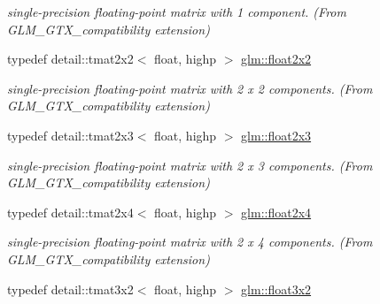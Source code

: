 \begin{DoxyCompactItemize}
\begin{DoxyCompactList}\small\item\em single-\/precision floating-\/point matrix with 1 component. (From G\+L\+M\+\_\+\+G\+T\+X\+\_\+compatibility extension) \end{DoxyCompactList}\item 
typedef detail\+::tmat2x2$<$ float, highp $>$ \hyperlink{group__gtx__compatibility_gaa4a1e4449913b2437f12434ed713dd73}{glm\+::float2x2}\hypertarget{group__gtx__compatibility_gaa4a1e4449913b2437f12434ed713dd73}{}\label{group__gtx__compatibility_gaa4a1e4449913b2437f12434ed713dd73}

\begin{DoxyCompactList}\small\item\em single-\/precision floating-\/point matrix with 2 x 2 components. (From G\+L\+M\+\_\+\+G\+T\+X\+\_\+compatibility extension) \end{DoxyCompactList}\item 
typedef detail\+::tmat2x3$<$ float, highp $>$ \hyperlink{group__gtx__compatibility_gaf6c91675c075853da392b1d2dfc45f65}{glm\+::float2x3}\hypertarget{group__gtx__compatibility_gaf6c91675c075853da392b1d2dfc45f65}{}\label{group__gtx__compatibility_gaf6c91675c075853da392b1d2dfc45f65}

\begin{DoxyCompactList}\small\item\em single-\/precision floating-\/point matrix with 2 x 3 components. (From G\+L\+M\+\_\+\+G\+T\+X\+\_\+compatibility extension) \end{DoxyCompactList}\item 
typedef detail\+::tmat2x4$<$ float, highp $>$ \hyperlink{group__gtx__compatibility_gaaff795523eb814705d3f1cc7fd3421f2}{glm\+::float2x4}\hypertarget{group__gtx__compatibility_gaaff795523eb814705d3f1cc7fd3421f2}{}\label{group__gtx__compatibility_gaaff795523eb814705d3f1cc7fd3421f2}

\begin{DoxyCompactList}\small\item\em single-\/precision floating-\/point matrix with 2 x 4 components. (From G\+L\+M\+\_\+\+G\+T\+X\+\_\+compatibility extension) \end{DoxyCompactList}\item 
typedef detail\+::tmat3x2$<$ float, highp $>$ \hyperlink{group__gtx__compatibility_ga19bcbd4d65c70cd07907b2d688bc84ed}{glm\+::float3x2}\hypertarget{group__gtx__compatibility_ga19bcbd4d65c70cd07907b2d688bc84ed}{}\label{group__gtx__compatibility_ga19bcbd4d65c70cd07907b2d688bc84ed}


\end{DoxyCompactItemize}
